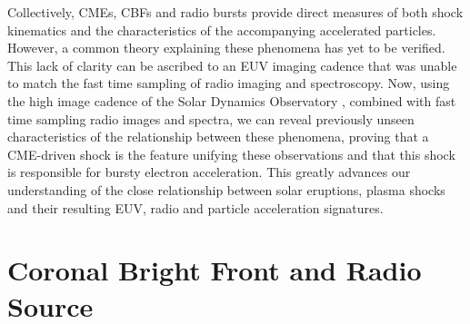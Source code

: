 Collectively, CMEs, CBFs and radio bursts provide direct measures of both shock kinematics and the characteristics of the accompanying accelerated particles. However, a common theory explaining these phenomena has yet to be verified.
This lack of clarity can be ascribed to an EUV imaging cadence that was unable to match the fast time sampling of radio imaging and spectroscopy. Now, using the high image cadence of the Solar Dynamics Observatory \citep[SDO;][]{presnell2012}, combined with fast time sampling radio images and spectra, we can reveal previously unseen characteristics of the relationship between these phenomena, proving that a CME-driven shock is the feature unifying these observations and that this shock is responsible for bursty electron acceleration. This greatly advances our understanding of the close relationship between solar eruptions, plasma shocks and their resulting EUV, radio and particle acceleration signatures.



\section{Coronal Bright Front and Radio Source}\label{sec:10}

